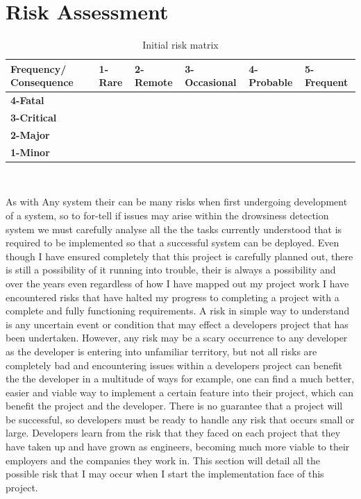 \section{Risk Assessment }
\begin{table}[h]
\centering
\scriptsize
\caption{Initial risk matrix}
\begin{tabular}{|p{2cm}|p{2cm}|p{2cm}| p{2cm} |p{2cm}| p{2cm}|}
\hline \bf Frequency/ Consequence & \bf 1-Rare & \bf 2-Remote & \bf 3-Occasional & \bf 4-Probable & \bf 5-Frequent\\ [10pt]

\hline \bf 4-Fatal & \cellcolor{yellow!50} & \cellcolor{red!50} & \cellcolor{red!50} & \cellcolor{red!50} &\cellcolor{red!50} \\ [10pt]

\hline \bf 3-Critical &\cellcolor{green!50} & \cellcolor{yellow!50} & \cellcolor{yellow!50} & \cellcolor{red!50} &\cellcolor{red!50} \\ [10pt]

\hline \bf 2-Major & \cellcolor{green!50} & \cellcolor{green!50} & \cellcolor{yellow!50} &\cellcolor{yellow!50} &\cellcolor{red!50} \\ [10pt]

\hline \bf 1-Minor & \cellcolor{green!50} & \cellcolor{green!50} & \cellcolor{green!50} &\cellcolor{yellow!50} &\cellcolor{yellow!50} \\ [10pt]
\hline
\end{tabular} \\
\label{tab:ProjRisks}
\end{table}
As with Any system their can be many risks when first undergoing development of a system, so to for-tell if issues may arise within the drowsiness detection system we must carefully analyse all the the tasks currently understood that is required to be implemented so that a successful system can be deployed. Even though I have ensured completely that this project is carefully planned out, there is still a possibility of it running into trouble, their is always a possibility  and over the years even regardless of how I have mapped out my project work I have encountered risks that have halted my progress to completing a project with a complete and fully functioning requirements.   A  risk  in  simple way to understand  is  any  uncertain  event  or  condition  that  may  effect a developers project that has been undertaken.  However, any risk may be a scary occurrence to any developer as the developer is entering into unfamiliar territory, but not all risks are completely bad and encountering issues within a developers project can benefit the the developer in a multitude of ways for example,  one can find a  much better, easier and viable way to  implement  a certain  feature into their project,  which  can  benefit the  project and the developer.   There  is  no  guarantee that a project will be successful, so developers must be ready to handle any risk that occurs small or large. Developers learn from the risk that they faced on each project that they have taken up and have grown as engineers, becoming much more viable to their employers and the companies they work in. 
This section will detail all the possible risk that I may occur when I start the implementation face of this project.

